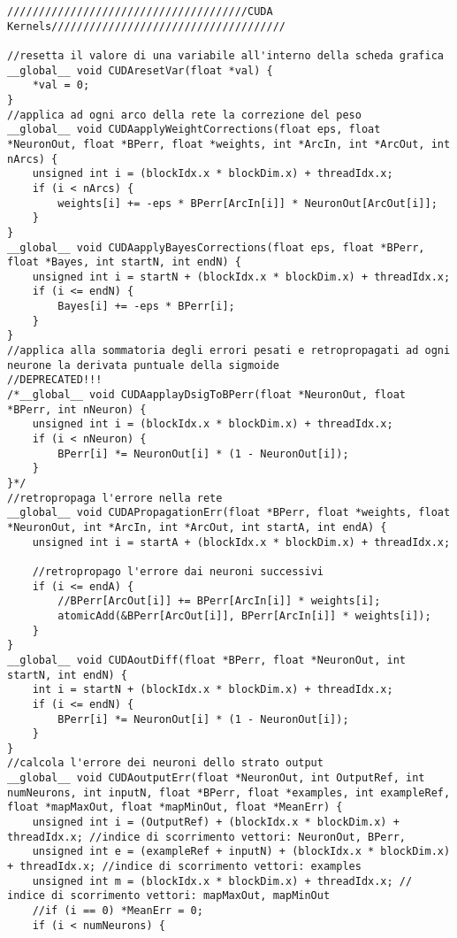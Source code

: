 \documentclass[10pt,a4paper]{article}
\begin{document}
\begin{lstlisting}[style=mycuda, caption=cuda kernels, captionpos=b]
//////////////////////////////////////CUDA Kernels/////////////////////////////////////

//resetta il valore di una variabile all'interno della scheda grafica
__global__ void CUDAresetVar(float *val) {
	*val = 0;
}
//applica ad ogni arco della rete la correzione del peso
__global__ void CUDAapplyWeightCorrections(float eps, float *NeuronOut, float *BPerr, float *weights, int *ArcIn, int *ArcOut, int nArcs) {
	unsigned int i = (blockIdx.x * blockDim.x) + threadIdx.x;
	if (i < nArcs) {
		weights[i] += -eps * BPerr[ArcIn[i]] * NeuronOut[ArcOut[i]];
	}
}
__global__ void CUDAapplyBayesCorrections(float eps, float *BPerr, float *Bayes, int startN, int endN) {
	unsigned int i = startN + (blockIdx.x * blockDim.x) + threadIdx.x;
	if (i <= endN) {
		Bayes[i] += -eps * BPerr[i];
	}
}
//applica alla sommatoria degli errori pesati e retropropagati ad ogni neurone la derivata puntuale della sigmoide 
//DEPRECATED!!!
/*__global__ void CUDAapplayDsigToBPerr(float *NeuronOut, float *BPerr, int nNeuron) {
	unsigned int i = (blockIdx.x * blockDim.x) + threadIdx.x;
	if (i < nNeuron) {
		BPerr[i] *= NeuronOut[i] * (1 - NeuronOut[i]);
	}
}*/
//retropropaga l'errore nella rete 
__global__ void CUDAPropagationErr(float *BPerr, float *weights, float *NeuronOut, int *ArcIn, int *ArcOut, int startA, int endA) {
	unsigned int i = startA + (blockIdx.x * blockDim.x) + threadIdx.x;

	//retropropago l'errore dai neuroni successivi
	if (i <= endA) {
		//BPerr[ArcOut[i]] += BPerr[ArcIn[i]] * weights[i];
		atomicAdd(&BPerr[ArcOut[i]], BPerr[ArcIn[i]] * weights[i]);
	}
}
__global__ void CUDAoutDiff(float *BPerr, float *NeuronOut, int startN, int endN) {
	int i = startN + (blockIdx.x * blockDim.x) + threadIdx.x;
	if (i <= endN) {
		BPerr[i] *= NeuronOut[i] * (1 - NeuronOut[i]);
	}
}
//calcola l'errore dei neuroni dello strato output
__global__ void CUDAoutputErr(float *NeuronOut, int OutputRef, int numNeurons, int inputN, float *BPerr, float *examples, int exampleRef, float *mapMaxOut, float *mapMinOut, float *MeanErr) {
	unsigned int i = (OutputRef) + (blockIdx.x * blockDim.x) + threadIdx.x; //indice di scorrimento vettori: NeuronOut, BPerr, 
	unsigned int e = (exampleRef + inputN) + (blockIdx.x * blockDim.x) + threadIdx.x; //indice di scorrimento vettori: examples
	unsigned int m = (blockIdx.x * blockDim.x) + threadIdx.x; // indice di scorrimento vettori: mapMaxOut, mapMinOut
	//if (i == 0) *MeanErr = 0;
	if (i < numNeurons) {


\end{lstlisting}
\end{document}
